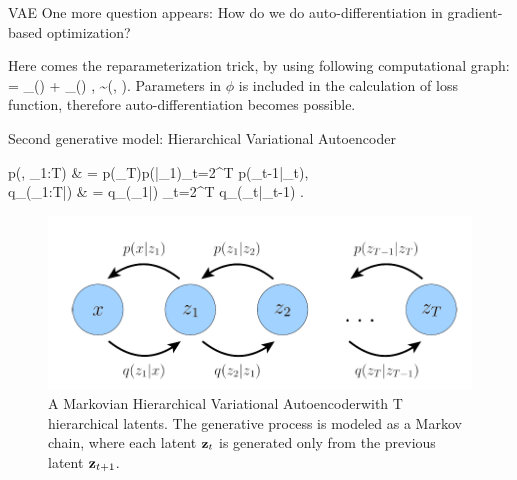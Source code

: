\documentclass{beamer}
\begin{document}
\begin{frame}{VAE}
	One more question appears: How do we do auto-differentiation in gradient-based optimization?
	
	Here comes the reparameterization trick, by using following computational graph:
	\bequn
		\mfz = \mu_{\phi}(\mfx) + \sigma_{\phi}(\mfx) \odot \epsilon, \quad \epsilon\sim \mcN(, \mfI).
	\eequn
	Parameters in $\phi$ is included in the calculation of loss function, therefore auto-differentiation becomes possible.
\end{frame}


\begin{frame}{Second generative model: Hierarchical Variational Autoencoder}
\bequn
	\begin{aligned}
	p(\mfx, \mfz_{1:T}) & = p(\mfz_T)p(\mfx|\mfz_1)\prod_{t=2}^T p(\mfz_{t-1}|\mfz_t), 		\\
	q_{\phi}(\mfz_{1:T}|\mfx) & = q_{\phi}(\mfz_1|\mfx) \prod_{t=2}^T q_{\phi}(\mfz_{t}|\mfz_{t-1}) .
	\end{aligned}
\eequn
\begin{figure}[H]
          \centering
          \centerline{\includegraphics[width=0.6\linewidth]{fig/HVAE.png}}
          \caption{A Markovian Hierarchical Variational Autoencoder\footnotemark with T hierarchical latents. The generative process is modeled as a Markov chain, where each latent $\mathbf{z}_t$ is generated only from the previous latent $\mathbf{z}_{t+1}$.}
        \end{figure}
\end{frame}
\end{document}
